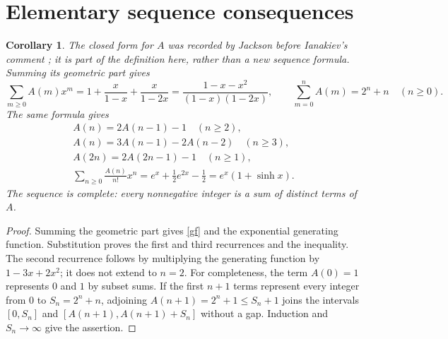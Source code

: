 \documentclass[11pt]{article}
\newtheorem{corollary}[theorem]{Corollary}
\begin{document}
\section{Elementary sequence consequences}
\begin{corollary}\label{sequenceidentities}
The closed form for $A$ was recorded by Jackson before Ianakiev's
comment \cite{oeisA}; it is part of the definition here, rather than
a new sequence formula. Summing its geometric part gives
\begin{equation}\label{gf}
 \sum_{m\ge0}A(m)x^m
 =1+\frac{x}{1-x}+\frac{x}{1-2x}
 =\frac{1-x-x^2}{(1-x)(1-2x)},\qquad
 \sum_{m=0}^n A(m)=2^n+n\quad(n\ge0).
\end{equation}
The same formula gives
\[
 \begin{gathered}
 A(n)=2A(n-1)-1\quad(n\ge2),\\
 A(n)=3A(n-1)-2A(n-2)\quad(n\ge3),\\
 A(2n)=2A(2n-1)-1\quad(n\ge1),\\
 \sum_{n\ge0}\frac{A(n)}{n!}x^n
  =e^x+\tfrac12e^{2x}-\tfrac12=e^x(1+\sinh x).
 \end{gathered}
\]
The sequence is complete: every nonnegative integer is a sum of distinct
terms of $A$.
\end{corollary}
\begin{proof}
Summing the geometric part gives \eqref{gf} and the exponential
generating function. Substitution proves the first and third recurrences
and the inequality. The second recurrence follows by multiplying the generating
function by $1-3x+2x^2$; it does not extend to $n=2$.
For completeness, the term $A(0)=1$
represents $0$ and $1$ by subset sums. If the first $n+1$ terms represent
every integer from $0$ to $S_n=2^n+n$, adjoining
$A(n+1)=2^n+1\le S_n+1$ joins the intervals
$[0,S_n]$ and $[A(n+1),A(n+1)+S_n]$ without a gap. Induction and
$S_n\to\infty$ give the assertion.
\end{proof}
\end{document}
